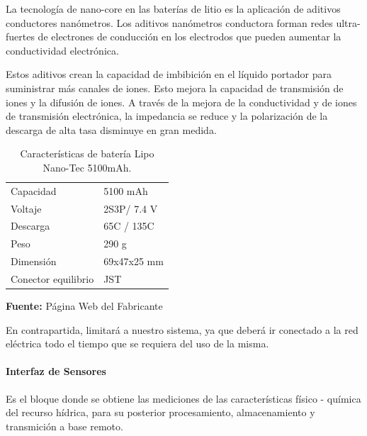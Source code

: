 La tecnolog\'ia de nano-core en las bater\'ias de litio es la aplicaci\'on de aditivos conductores nan\'ometros. Los aditivos nan\'ometros conductora forman redes ultra-fuertes de electrones de conducci\'on en los electrodos que pueden aumentar la conductividad electr\'onica.

Estos aditivos crean la capacidad de imbibici\'on en el l\'iquido portador para suministrar m\'as canales de iones. Esto mejora la capacidad de transmisi\'on de iones y la difusi\'on de iones. A trav\'es de la mejora de la conductividad y de iones de transmisi\'on electr\'onica, la impedancia se reduce y la polarizaci\'on de la descarga de alta tasa disminuye en gran medida.

\hfill
\begin{table}[t]
\protect\caption[Caracter\'isticas de bater\'ia Lipo Nano-Tech ]{Caracter\'isticas de bater\'ia Lipo Nano-Tec 5100mAh.}
\label{tab:caract_bat}
\begin{center}
\begin{tabular}{l l}
\hline
Capacidad    &  5100 mAh \\
Voltaje      &  2S3P/ 7.4 V \\
Descarga &  65C / 135C \\
Peso  & 290 g\\
Dimensi\'on   &  69x47x25 mm\\
Conector equilibrio	& JST\\
\hline
\end{tabular}
\vspace{5mm}
\newline
\hfill \textbf{Fuente:} P\'agina Web del Fabricante\cite{bateria}
\end{center}
\end{table}

En contrapartida, limitará a nuestro sistema, ya que deberá ir conectado a la red eléctrica todo el tiempo que se requiera del uso de la misma.

\paragraph[Interfaz de Sensores]{Interfaz de Sensores}
Es el bloque donde se obtiene las mediciones de las caracter\'isticas f\'isico - qu\'imica del recurso h\'idrica, para su posterior procesamiento, almacenamiento y transmici\'on a base remoto.

